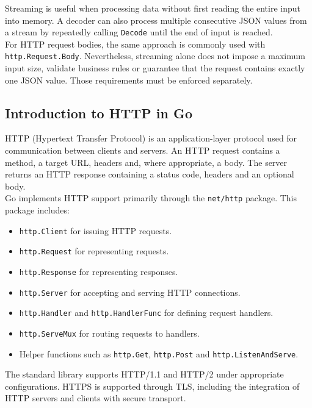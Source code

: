 Streaming is useful when processing data without first reading the entire input into memory. A decoder can also process multiple consecutive JSON values from a stream by repeatedly calling \texttt{Decode} until the end of input is reached.\\

For HTTP request bodies, the same approach is commonly used with \texttt{http.Request.Body}. Nevertheless, streaming alone does not impose a maximum input size, validate business rules or guarantee that the request contains exactly one JSON value. Those requirements must be enforced separately.\\

\subsection{Introduction to HTTP in Go}

HTTP (Hypertext Transfer Protocol) is an application-layer protocol used for communication between clients and servers. An HTTP request contains a method, a target URL, headers and, where appropriate, a body. The server returns an HTTP response containing a status code, headers and an optional body.\\

Go implements HTTP support primarily through the \texttt{net/http} package. This package includes:

\begin{itemize}
    \item \texttt{http.Client} for issuing HTTP requests.
    \item \texttt{http.Request} for representing requests.
    \item \texttt{http.Response} for representing responses.
    \item \texttt{http.Server} for accepting and serving HTTP connections.
    \item \texttt{http.Handler} and \texttt{http.HandlerFunc} for defining request handlers.
    \item \texttt{http.ServeMux} for routing requests to handlers.
    \item Helper functions such as \texttt{http.Get}, \texttt{http.Post} and \texttt{http.ListenAndServe}.
\end{itemize}

The standard library supports HTTP/1.1 and HTTP/2 under appropriate configurations. HTTPS is supported through TLS, including the integration of HTTP servers and clients with secure transport.\\


